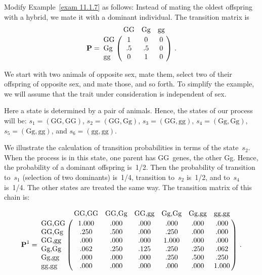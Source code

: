 \begin{example}\label{exam 11.1.8}
Modify Example~\ref{exam 11.1.7} as follows:  Instead of mating the oldest
offspring with a hybrid, we mate it with a dominant individual.  The transition
matrix
is
$$
\mat{P} = \bordermatrix{
   & \mbox{GG} & \mbox{Gg} &\mbox{gg} \cr
\mbox{GG} &  1 &  0 &  0 \cr
\mbox{Gg} & .5 & .5 &  0 \cr
\mbox{gg} &  0 &  1 &  0}\ .
$$
\end{example}

\begin{example}\label{exam 11.1.9}
We start with two animals of opposite sex, mate them, select two of their
offspring of opposite sex, and mate those, and so forth.  To simplify the
example, we will assume that the trait under consideration is independent of
sex.
\par
Here a state is determined by a pair of animals.  Hence, the states of our
process will be: $s_1 = (\mbox{GG},\mbox{GG})$, $s_2 = (\mbox{GG},\mbox{Gg})$,
$s_3 = (\mbox{GG},\mbox{gg})$, $s_4 = (\mbox{Gg},\mbox{Gg})$, $s_5 =
(\mbox{Gg},\mbox{gg})$, and $s_6 = (\mbox{gg},\mbox{gg})$.
\par
We illustrate the calculation of transition probabilities in terms of the
state~$s_2$.  When the process is in this state, one parent has GG~genes, the
other Gg.  Hence, the probability of a dominant offspring is~1/2.  Then the
probability of transition to~$s_1$ (selection of two dominants) is~1/4,
transition to~$s_2$ is~1/2, and to~$s_4$ is~1/4.  The other states are treated
the same way.  The transition matrix of this chain is:  
\par

$$
{\mat{P}^1} = \bordermatrix{            
&\mbox{GG,GG}&\mbox{GG,Gg}&\mbox{GG,gg}&\mbox{Gg,Gg}&\mbox{Gg,gg}&\mbox{gg,gg}\cr
\mbox{GG,GG} & 1.000 & .000 &  .000 &  .000 &  .000 &  .000\cr
\mbox{GG,Gg} &  .250 & .500 &  .000 &  .250 &  .000 &  .000\cr
\mbox{GG,gg} &  .000 & .000 &  .000 & 1.000 &  .000 &  .000\cr
\mbox{Gg,Gg} &  .062 & .250 &  .125 &  .250 &  .250 &  .062\cr
\mbox{Gg,gg} &  .000 & .000 &  .000 &  .250 &  .500 &  .250\cr
\mbox{gg,gg} &  .000 & .000 &  .000 &  .000 &  .000 &  1.000}\ .
$$
 
\end{example}

